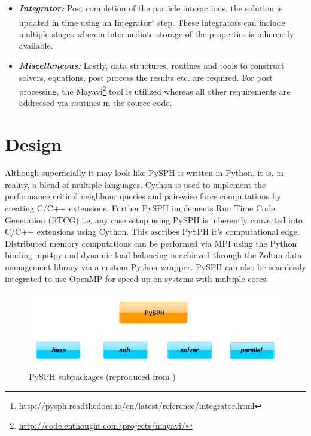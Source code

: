 \begin{itemize}
\item \textbf{\textit{Integrator: }}Post completion of the particle interactions, the solution is updated in time using an Integrator\footnote[7]{\url{http://pysph.readthedocs.io/en/latest/reference/integrator.html}} step. These integrators can include multiple-stages wherein intermediate storage of the properties is inherently available. 

\item \textbf{\textit{Miscellaneous: }}Lastly, data structures, routines and tools to construct solvers, equations, post process the results etc. are required. For post processing, the Mayavi\footnote[8]{\url{http://code.enthought.com/projects/mayavi/}} tool is utilized whereas all other requirements are addressed via routines in the source-code.
\end{itemize} 

\section{Design}\label{sec:pysph_design}

Although superficially it may look like PySPH is written in Python, it is, in reality, a blend of multiple languages. Cython is used to implement the performance critical neighbour queries and pair-wise force computations by creating C/C++ extensions. Further PySPH implements Run Time Code Generation (RTCG) i.e. any case setup using PySPH is inherently converted into C/C++ extensions using Cython. This ascribes PySPH it's computational edge. Distributed memory computations can be performed via MPI using the Python binding mpi4py \cite{mpi4py} and dynamic load balancing is achieved through the Zoltan data management library \cite{zoltan} via a custom Python wrapper. PySPH can also be seamlessly integrated to use OpenMP for speed-up on systems with multiple cores.

\begin{figure}[htb!]
\centering
\setlength\fboxsep{0pt}
      \includegraphics[scale=0.35]{figures/pysph_modules.png} 
\caption{{\small{PySPH subpackages (reproduced from \cite{prabhu_puri})}}}
\label{fig:pysph_modules}
\end{figure}

